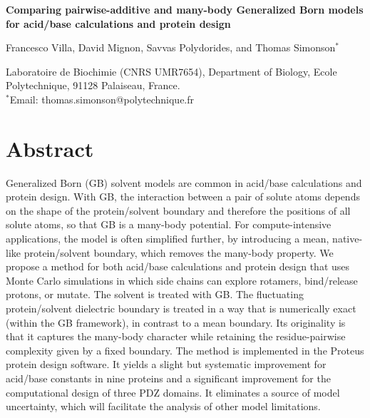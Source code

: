 \documentclass[a4paper,12pt]{article}
\begin{document}
 

\parindent 0mm

\begin{center}

\Large 
{\bf Comparing pairwise-additive and many-body Generalized Born models for acid/base calculations and protein design}

\large

\vspace{.5 cm}

Francesco Villa, David Mignon, Savvas Polydorides, and Thomas Simonson$^{\ast}$

\vspace{.5 cm}

\normalsize
 
Laboratoire de Biochimie (CNRS UMR7654), Department of Biology, 
Ecole Polytechnique, 91128 Palaiseau, France. \\
$^{\ast}$Email: thomas.simonson@polytechnique.fr

\end{center}

\vspace{0.5cm}

\section*{Abstract}
Generalized Born (GB) solvent models are common in acid/base calculations and protein design. With GB, the
interaction between a pair of solute atoms depends on the shape of the protein/solvent boundary and therefore
the positions of all solute atoms, so that GB is a many-body potential. For compute-intensive applications,
the model is often simplified further, by introducing a mean, native-like protein/solvent boundary, which
removes the many-body property. We propose a method for both acid/base calculations and protein design that
uses Monte Carlo simulations in which side chains can explore rotamers, bind/release protons, or mutate. The
solvent is treated with GB. The fluctuating protein/solvent dielectric boundary is treated in a way that is
numerically exact (within the GB framework), in contrast to a mean boundary. Its originality is that it captures
the many-body character while retaining the residue-pairwise complexity given by a fixed boundary. The method
is implemented in the Proteus protein design software. It yields a slight but systematic improvement for acid/base
constants in nine proteins and a significant improvement for the computational design of three PDZ domains. It
eliminates a source of model uncertainty, which will facilitate the analysis of other model limitations. 
\end{document}
